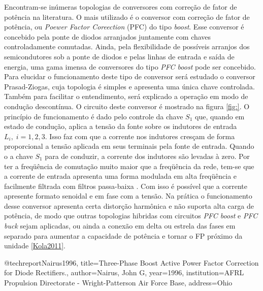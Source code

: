 Encontram-se inúmeras topologias de conversores com correção de fator de potência na literatura. O mais utilizado é o conversor com correção de fator de potência, ou \textit{Poewer Factor Coreection} (PFC) do tipo \textit{boost}. Esse conversor é concebido pela ponte de diodos arranjados juntamente com chaves controladamente comutadas. Ainda, pela flexibilidade de possíveis arranjos dos semicondutores sob a ponte de diodos e pelas linhas de entrada e saída de energia, uma gama imensa de conversores do tipo \textit{PFC boost} pode ser concebido. Para elucidar o funcionamento deste tipo de conversor será estudado o conversor Prasad-Ziogas, cuja topologia é simples e apresenta uma única chave controlada. Também para facilitar o entendimento, será explicado a operação em modo de condução descontínua. O circuito deste conversor é mostrado na figura \ref{fig:}. O princípio de funcionamento é dado pelo controle da chave $S_1$ que, quando em estado de condução, aplica a tensão da fonte sobre os indutores de entrada $L_i,\;i=1,2,3$. Isso faz com que a corrente nos indutores cresçam de forma proporcional a tensão aplicada em seus terminais pela fonte de entrada. Quando o a chave $S_1$ para de conduzir, a corrente dos indutores são levadas à zero. Por ter a freqüência de comutação muito maior que a freqüência da rede, tem-se que a corrente de entrada apresenta uma forma modulada em alta freqüência e facilmente filtrada com filtros passa-baixa \cite{Nairus1996, Takeuchi2008}. Com isso é possível que a corrente apresente formato senoidal e em fase com a tensão. Na prática o funcionamento desse conversor apresenta certa distorção harmônica e não suporta alta carga de potência, de modo que outras topologias hibridas com circuitos \textit{PFC boost} e \textit{PFC buck} sejam aplicadas, ou ainda a conexão em delta ou estrela das fases em separado para aumentar a capacidade de potência e tornar o FP próximo da unidade \ref{Kola2011}.

@techreport{Nairus1996,
  title={Three-Phase Boost Active Power Factor Correction for Diode Rectifiers.},
  author={Nairus, John G},
  year={1996},
  institution={AFRL Propulsion Directorate - Wright-Patterson Air Force Base},
  address={Ohio}
}
